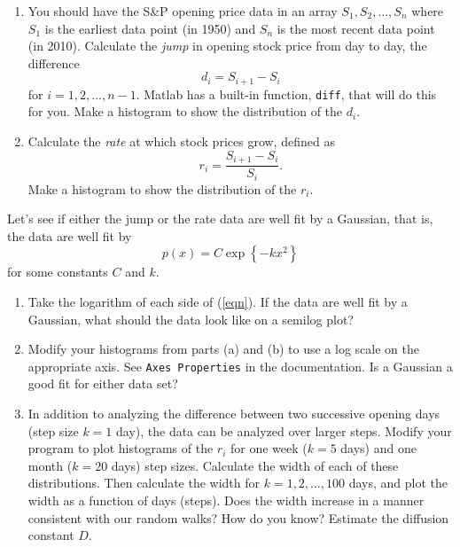 \documentclass[12pt]{article}
\begin{document}
\begin{enumerate}
\begin{enumerate}
\item You should have the S\&P opening price data in an array $S_1, S_2, \ldots, S_{n}$ where $S_1$ is the earliest data point (in 1950) and $S_{n}$ is the most recent data point (in 2010).  Calculate the \textit{jump} in opening stock price from day to day, the difference
\[
d_i = S_{i+1} - S_i
\]
for $i=1, 2, \ldots, n -1$.  Matlab has a built-in function, \verb+diff+, that will do this for you.  Make a histogram to show the distribution of the $d_i$.  
\item Calculate the \textit{ rate} at which stock prices grow, defined as
\[
r_i = \frac{S_{i + 1} - S_i}{S_i}.
\]
Make a histogram to show the distribution of the $r_i$.
\end{enumerate}
\noindent Let's see if either the jump or the rate data are well fit by a Gaussian, that is, the data are well fit by  
\begin{equation}\label{eqn}
p(x) = C \exp \left\{ - k x^2\right\}
\end{equation}
for some constants $C$ and $k$.  
\begin{enumerate}
\item[(c)] Take the logarithm of each side of (\ref{eqn}).  If the data are well fit by a Gaussian, what should the data look like on a semilog plot?
\item[(d)] Modify your histograms from parts (a) and (b) to use a log scale on the appropriate axis.  See  \verb+Axes Properties+ in the documentation.  Is a Gaussian a good fit for either data set? 
\item[(e)] In addition to analyzing the difference between two successive opening days (step size $k =1$ day), the data can be analyzed over larger steps.  Modify your program to plot histograms of the $r_i$ for one week ($k = 5$ days) and one month ($k = 20$ days) step sizes.  Calculate the width of each of these distributions.  Then calculate the width for $k = 1, 2, \ldots, 100$ days, and plot the width as a function of days (steps).  Does the width increase in a manner consistent with our random walks?  How do you know?  Estimate the diffusion constant $D$.
\end{enumerate}




\end{enumerate}
\end{document}

